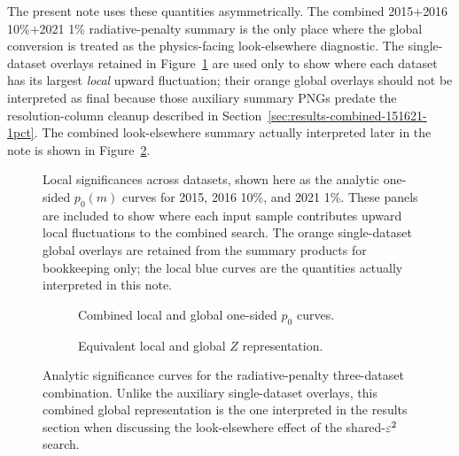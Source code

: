 The present note uses these quantities asymmetrically. The combined
2015$+$2016 10\%$+$2021 1\% radiative-penalty summary is the only place where the
global conversion is treated as the physics-facing look-elsewhere diagnostic. The
single-dataset overlays retained in Figure~\ref{fig:local-significances-across-datasets}
are used only to show where each dataset has its largest \emph{local} upward
fluctuation; their orange global overlays should not be interpreted as final because
those auxiliary summary PNGs predate the resolution-column cleanup described in
Section~\ref{sec:results-combined-151621-1pct}. The combined look-elsewhere summary
actually interpreted later in the note is shown in Figure~\ref{fig:combined-significance-rpen}.

\begin{figure}[p]
\centering
{}
\caption{Local significances across datasets, shown here as the analytic one-sided
$p_0(m)$ curves for 2015, 2016 10\%, and 2021 1\%. These panels are included to show
where each input sample contributes upward local fluctuations to the combined search.
The orange single-dataset global overlays are retained from the summary products for
bookkeeping only; the local blue curves are the quantities actually interpreted in this
note.}
\label{fig:local-significances-across-datasets}
\end{figure}

\begin{figure}[H]
\centering
\begin{subfigure}[t]{0.48\linewidth}
  \centering
  \caption{Combined local and global one-sided $p_0$ curves.}
\end{subfigure}
\hfill
\begin{subfigure}[t]{0.48\linewidth}
  \centering
  \caption{Equivalent local and global $Z$ representation.}
\end{subfigure}
\caption{Analytic significance curves for the radiative-penalty three-dataset
combination. Unlike the auxiliary single-dataset overlays, this combined global
representation is the one interpreted in the results section when discussing the
look-elsewhere effect of the shared-$\varepsilon^2$ search.}
\label{fig:combined-significance-rpen}
\end{figure}

